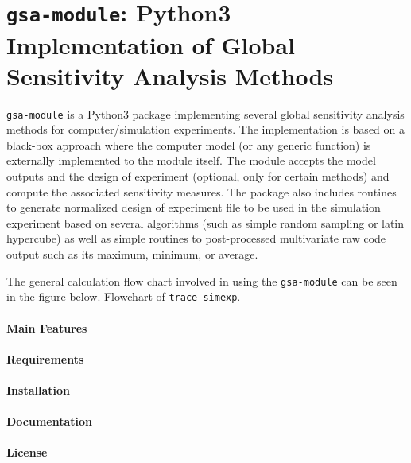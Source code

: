 \section[\texttt{gsa-module}]{\texttt{gsa-module}: Python3 Implementation of Global Sensitivity Analysis Methods}\label{app:gsa_module}

\texttt{gsa-module} is a Python3 package implementing several global sensitivity analysis methods for computer/simulation experiments.
The implementation is based on a black-box approach where the computer model (or any generic function) is externally implemented to the module itself.
The module accepts the model outputs and the design of experiment (optional, only for certain methods) and compute the associated sensitivity measures.
The package also includes routines to generate normalized design of experiment file to be used in the simulation experiment based on several algorithms (such as simple random sampling or latin hypercube) as well as simple routines to post-processed multivariate raw code output such as its maximum, minimum, or average.

The general calculation flow chart involved in using the \texttt{gsa-module} can be seen in the figure below.
{Flowchart of \texttt{trace-simexp}.}

\paragraph{Main Features}

\paragraph{Requirements}

\paragraph{Installation}

\paragraph{Documentation}

\paragraph{License}
